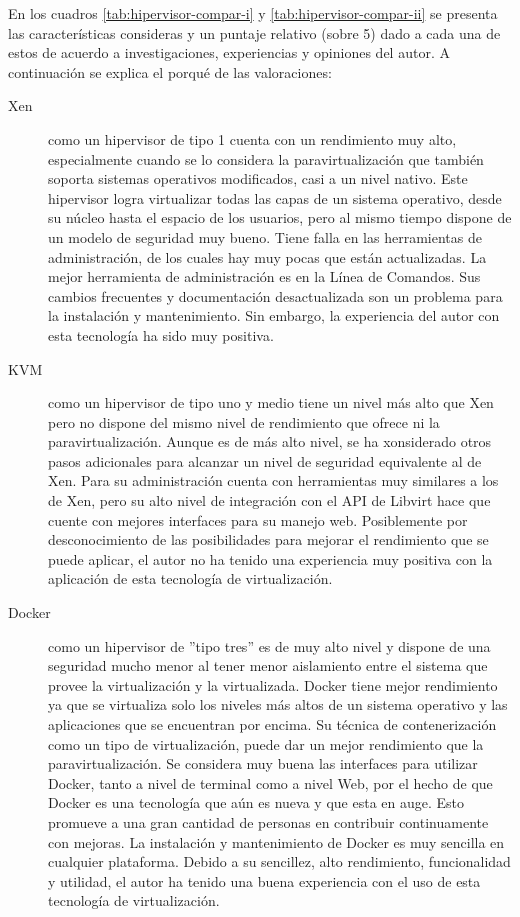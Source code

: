 En los cuadros \ref{tab:hipervisor-compar-i} y \ref{tab:hipervisor-compar-ii} se presenta las características consideras y un puntaje relativo (sobre 5) dado a cada una de estos de acuerdo a investigaciones, experiencias y opiniones del autor. A continuación se explica el porqué de las valoraciones:
\begin{description}
	\item[Xen] como un hipervisor de tipo 1 cuenta con un rendimiento muy alto, especialmente cuando se lo considera la paravirtualización que también soporta sistemas operativos modificados, casi a un nivel nativo. Este hipervisor logra virtualizar todas las capas de un sistema operativo, desde su núcleo hasta el espacio de los usuarios, pero al mismo tiempo dispone de un modelo de seguridad muy bueno. Tiene falla en las herramientas de administración, de los cuales hay muy pocas que están actualizadas. La mejor herramienta de administración es en la Línea de Comandos. Sus cambios frecuentes y documentación desactualizada son un problema para la instalación y mantenimiento. Sin embargo, la experiencia del autor con esta tecnología ha sido muy positiva.
    \item[KVM] como un hipervisor de tipo uno y medio tiene un nivel más alto que Xen pero no dispone del mismo nivel de rendimiento que ofrece ni la paravirtualización. Aunque es de más alto nivel, se ha xonsiderado otros pasos adicionales para alcanzar un nivel de seguridad equivalente al de Xen. Para su administración cuenta con herramientas muy similares a los de Xen, pero su alto nivel de integración con el API de Libvirt hace que cuente con mejores interfaces para su manejo web. Posiblemente por desconocimiento de las posibilidades para mejorar el rendimiento que se puede aplicar, el autor no ha tenido una experiencia muy positiva con la aplicación de esta tecnología de virtualización.
    \item[Docker] como un hipervisor de ''tipo tres'' es de muy alto nivel y dispone de una seguridad mucho menor al tener menor aislamiento entre el sistema que provee la virtualización y la virtualizada. Docker tiene mejor rendimiento ya que se virtualiza solo los niveles más altos de un sistema operativo y las aplicaciones que se encuentran por encima. Su técnica de contenerización como un tipo de virtualización, puede dar un mejor rendimiento que la paravirtualización. Se considera muy buena las interfaces para utilizar Docker, tanto a nivel de terminal como a nivel Web, por el hecho de que Docker es una tecnología que aún es nueva y que esta en auge. Esto promueve a una gran cantidad de personas en contribuir continuamente con mejoras. La instalación y mantenimiento de Docker es muy sencilla en cualquier plataforma. Debido a su sencillez, alto rendimiento, funcionalidad y utilidad, el autor ha tenido una buena experiencia con el uso de esta tecnología de virtualización. 
\end{description}

